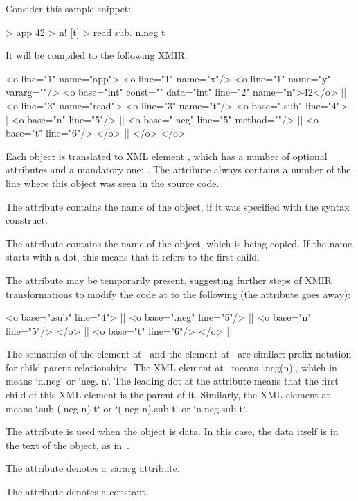 Consider this sample \eo{} snippet:

\begin{ffcode}
[x y...] > app
  42 > n!
  [t] > read
    sub.
      n.neg
      t
\end{ffcode}

It will be compiled to the following XMIR:

\begin{ffcode}
<o line="1" name="app">
  <o line="1" name="x"/>
  <o line="1" name="y" vararg=""/>
  <o base="int" const="" data="int"
    line="2" name="n">42</o>   |$\label{ln:xml-data}$|
  <o line="3" name="read">
    <o line="3" name="t"/>
    <o base=".sub" line="4"> |$\label{ln:xml-sub}$|
      <o base="n" line="5"/> |$\label{ln:method-start}$|
      <o base=".neg" line="5" method=""/>  |$\label{ln:method-end}$|
      <o base="t" line="6"/>
    </o> |$\label{ln:xml-sub-end}$|
  </o>
</o>
\end{ffcode}

Each object is translated to XML element , which has
a number of optional attributes and a mandatory one: .
The attribute  always contains a number of the
line where this object was seen in the source code.

The attribute  contains the name of the object, if
it was specified with the \ff{>} syntax construct.

The attribute  contains the name of the object, which
is being copied. If the name starts with a dot, this means
that it refers to the first  child.

The attribute  may be temporarily present, suggesting
further steps of XMIR transformations to modify the code
at  to the following (the attribute 
goes away):

\begin{ffcode}
<o base=".sub" line="4"> |$\label{ln:new-sub}$|
  <o base=".neg" line="5"/> |$\label{ln:xml-neg}$|
    <o base="n" line="5"/>
  </o> |$\label{ln:xml-neg-end}$|
  <o base="t" line="6"/>
</o> |$\label{ln:new-sub-end}$|
\end{ffcode}

The semantics of the element  at~
and the element  at~ are similar: prefix
notation for child-parent relationships. The XML element at~
means `.neg(n)`, which in~\eo{} means `n.neg` or `neg. n`. The
leading dot at the attribute  means that the first
child of this XML element is the \eo{} parent of it.
Similarly, the XML element at ~
means `.sub (.neg n) t` or `(.neg n).sub t` or `n.neg.sub t`.

The attribute  is used when the object is data. In this
case, the data itself is in the text of the object, as in~.

The attribute  denotes a vararg attribute.

The attribute  denotes a constant.

